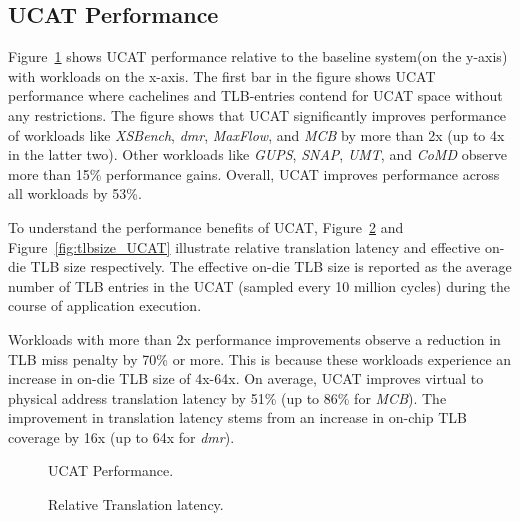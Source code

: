 \subsection{UCAT Performance}


\noindent Figure~\ref{fig:perf_UCAT} shows UCAT performance relative
to the baseline system(on the y-axis) with workloads on the x-axis.
The first bar in the figure shows UCAT performance where cachelines
and TLB-entries contend for UCAT space without any restrictions. The
figure shows that UCAT significantly improves performance of workloads
like {\em XSBench}, {\em dmr}, {\em MaxFlow}, and {\em MCB} by more
than 2x (up to 4x in the latter two). Other workloads like {\em GUPS},
{\em SNAP}, {\em UMT}, and {\em CoMD} observe more than 15\%
performance gains. Overall, UCAT improves performance across all
workloads by 53\%.

To understand the performance benefits of UCAT,
Figure~\ref{fig:tlblat_UCAT} and Figure~\ref{fig:tlbsize_UCAT}
illustrate relative translation latency and effective on-die TLB size
respectively. The effective on-die TLB size is reported as the average
number of TLB entries in the UCAT (sampled every 10 million cycles)
during the course of application execution.

Workloads with more than 2x performance improvements observe a
reduction in TLB miss penalty by 70\% or more. This is because these
workloads experience an increase in on-die TLB size of 4x-64x. On
average, UCAT improves virtual to physical address translation latency
by 51\% (up to 86\% for {\em MCB}). The improvement in translation
latency stems from an increase in on-chip TLB coverage by 16x (up to
64x for {\em dmr}).

\begin{figure}[tp] 
  \vspace{-0.in} \centering
  \centerline{}

  \caption{\small UCAT Performance. \normalsize}
  \label{fig:perf_UCAT} 
  \vspace{0.1 in}
\end{figure}

\begin{figure}[tp] 
  \vspace{0.1in} \centering
  \centerline{}

  \caption{\small Relative Translation latency.\normalsize}
  \label{fig:tlblat_UCAT} 
  \vspace{-0.0 in}
\end{figure}

